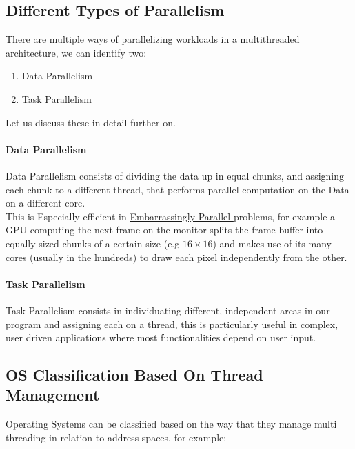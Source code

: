 \documentclass[openright, twoside]{report}
\theoremstyle{definition}
\theoremstyle{example}
\begin{document}
		\subsection{Different Types of Parallelism}
		There are multiple ways of parallelizing workloads in a multithreaded architecture,
		we can identify two:
		\begin{enumerate}
			\item Data Parallelism
			\item Task Parallelism
		\end{enumerate}

		Let us discuss these in detail further on.

			\paragraph{Data Parallelism}
			Data Parallelism consists of dividing the data up in equal chunks, and assigning
			each chunk to a different thread, that performs parallel computation on the Data 
			on a different core.\\

			This is Especially efficient in \href{
				https://en.wikipedia.org/wiki/Embarrassingly_parallel
				}{
					Embarrassingly Parallel
			} problems, for example a GPU computing the next frame on the monitor splits
			the frame buffer into equally sized chunks of a certain size (e.g $16\times16$)
			and makes use of its many cores (usually in the hundreds) to draw each pixel 
			independently from the other. 


			\paragraph{Task Parallelism}
			Task Parallelism consists in individuating different, independent areas in our 
			program and assigning each on a thread, this is particularly useful in complex,
			user driven applications where most functionalities depend on user input.

		\subsection{OS Classification Based On Thread Management}

		Operating Systems can be classified based on the way that they manage multi threading 
		in relation to address spaces, for example:
\end{document}
